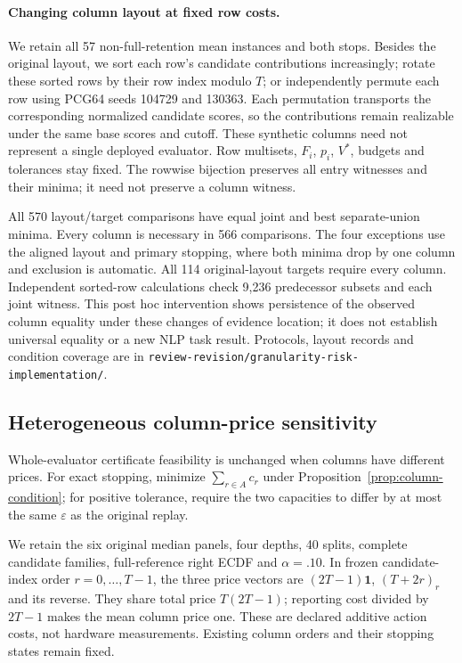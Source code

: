 \paragraph{Changing column layout at fixed row costs.}
We retain all 57 non-full-retention mean instances and both stops. Besides the original layout, we sort each row's candidate contributions increasingly; rotate these sorted rows by their row index modulo $T$; or independently permute each row using PCG64 seeds 104729 and 130363. Each permutation transports the corresponding normalized candidate scores, so the contributions remain realizable under the same base scores and cutoff. These synthetic columns need not represent a single deployed evaluator. Row multisets, $F_i$, $p_i$, $V^*$, budgets and tolerances stay fixed. The rowwise bijection preserves all entry witnesses and their minima; it need not preserve a column witness.

All 570 layout/target comparisons have equal joint and best separate-union minima. Every column is necessary in 566 comparisons. The four exceptions use the aligned layout and primary stopping, where both minima drop by one column and exclusion is automatic. All 114 original-layout targets require every column. Independent sorted-row calculations check 9,236 predecessor subsets and each joint witness. This post hoc intervention shows persistence of the observed column equality under these changes of evidence location; it does not establish universal equality or a new NLP task result. Protocols, layout records and condition coverage are in \nolinkurl{review-revision/granularity-risk-implementation/}.

\subsection{Heterogeneous column-price sensitivity}
\label{app:column-prices}
Whole-evaluator certificate feasibility is unchanged when columns have different prices. For exact stopping, minimize $\sum_{r\in A}c_r$ under Proposition~\ref{prop:column-condition}; for positive tolerance, require the two capacities to differ by at most the same $\varepsilon$ as the original replay.

We retain the six original median panels, four depths, 40 splits, complete candidate families, full-reference right ECDF and $\alpha=.10$. In frozen candidate-index order $r=0,\ldots,T-1$, the three price vectors are $(2T-1)\mathbf1$, $(T+2r)_r$ and its reverse. They share total price $T(2T-1)$; reporting cost divided by $2T-1$ makes the mean column price one. These are declared additive action costs, not hardware measurements. Existing column orders and their stopping states remain fixed.


